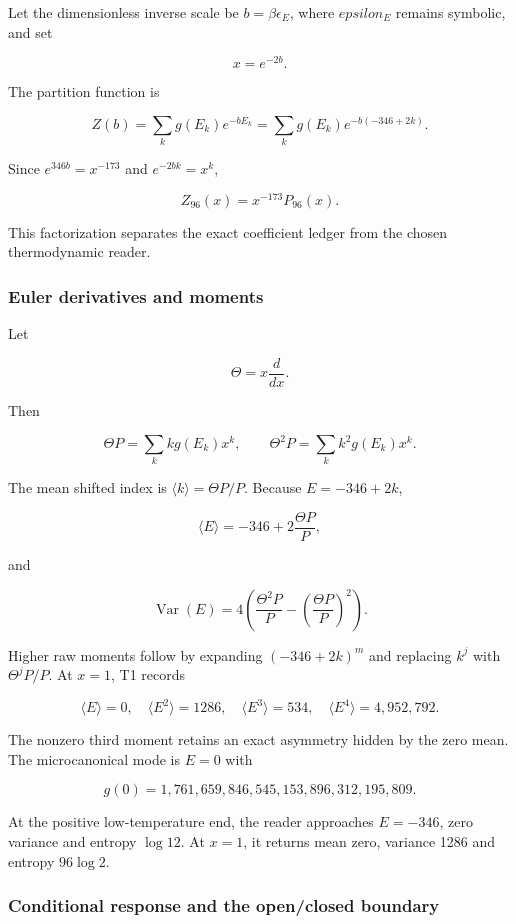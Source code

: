Let the dimensionless inverse scale be \(b=\beta\epsilon_E\), where
\(epsilon_E\) remains symbolic, and set

\[
x=e^{-2b}.
\]

The partition function is

\[
Z(b)=\sum_k g(E_k)e^{-bE_k}
=\sum_k g(E_k)e^{-b(-346+2k)}.
\]

Since \(e^{346b}=x^{-173}\) and \(e^{-2bk}=x^k\),

\[
Z_{96}(x)=x^{-173}P_{96}(x).
\]

This factorization separates the exact coefficient ledger from the
chosen thermodynamic reader.

\subsubsection{Euler derivatives and
moments}\label{viii-ch03-euler-derivatives-and-moments}

Let

\[
\Theta=x\frac{d}{dx}.
\]

Then

\[
\Theta P=\sum_k k g(E_k)x^k,
\qquad
\Theta^2P=\sum_k k^2g(E_k)x^k.
\]

The mean shifted index is \(\langle k\rangle=\Theta P/P\). Because
\(E=-346+2k\),

\[
\langle E\rangle=-346+2\frac{\Theta P}{P},
\]

and

\[
\operatorname{Var}(E)
=4\left(\frac{\Theta^2P}{P}
-\left(\frac{\Theta P}{P}\right)^2\right).
\]

Higher raw moments follow by expanding \((-346+2k)^m\) and replacing
\(k^j\) with \(\Theta^jP/P\). At \(x=1\), T1 records

\[
\langle E\rangle=0,
\quad\langle E^2\rangle=1286,
\quad\langle E^3\rangle=534,
\quad\langle E^4\rangle=4{,}952{,}792.
\]

The nonzero third moment retains an exact asymmetry hidden by the zero
mean. The microcanonical mode is \(E=0\) with

\[
g(0)=1{,}761{,}659{,}846{,}545{,}153{,}896{,}312{,}195{,}809.
\]

At the positive low-temperature end, the reader approaches \(E=-346\),
zero variance and entropy \(\log 12\). At \(x=1\), it returns mean zero,
variance 1286 and entropy \(96\log2\).

\subsubsection{Conditional response and the open/closed
boundary}\label{viii-ch03-conditional-response-and-the-openclosed-boundary}

